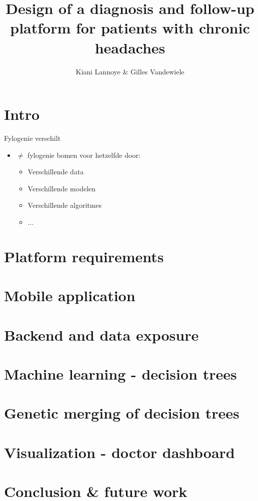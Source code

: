 \documentclass[english]{beamer}
\title{Design of a diagnosis and follow-up platform for patients with chronic headaches}
\author{Kiani Lannoye \& Gilles Vandewiele}
\begin{document}
\begin{frame}
	\titlepage
\end{frame}
\section{Intro}
\label{sec:intro}
\begin{frame}{Fylogenie verschilt}
\begin{itemize}
	\item $\neq$ fylogenie bomen voor hetzelfde door:
	\begin{itemize}
		\item Verschillende data
		\item Verschillende modelen
		\item Verschillende algoritmes
		\item ...
	\end{itemize}
\end{itemize}
\end{frame}
\section{Platform requirements}
\label{sec:simMess}
\section{Mobile application}
\section{Backend and data exposure}
\section{Machine learning - decision trees}
\section{Genetic merging of decision trees}
\section{Visualization - doctor dashboard}
\section{Conclusion \& future work}




\end{document}
